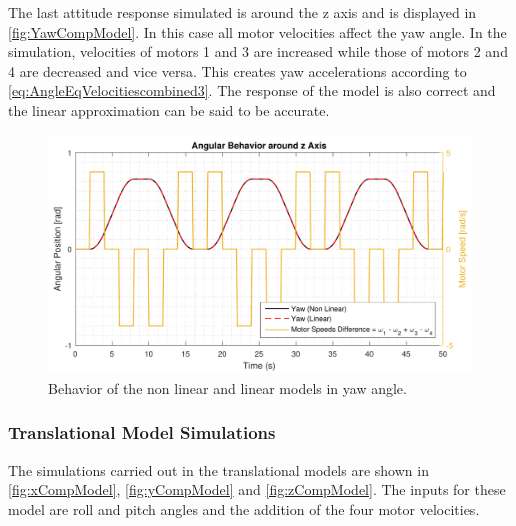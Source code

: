 %
The last attitude response simulated is around the z axis and is displayed in \autoref{fig:YawCompModel}. In this case all motor velocities affect the yaw angle. In the simulation, velocities of motors 1 and 3 are increased while those of motors 2 and 4 are decreased and vice versa. This creates yaw accelerations according to \autoref{eq:AngleEqVelocitiescombined3}. The response of the model is also correct and the linear approximation can be said to be accurate. 
%
\begin{figure}[H]
	\centering
	\includegraphics[scale=0.65]{figures/yawCompModel}
	\caption{Behavior of the non linear and linear models in yaw angle.}
	\label{fig:yawCompModel}
\end{figure}

\subsubsection{Translational Model Simulations}
The simulations carried out in the translational models are shown in  \autoref{fig:xCompModel}, \ref{fig:yCompModel} and \ref{fig:zCompModel}. The inputs for these model are roll and pitch angles and the addition of the four motor velocities. 

